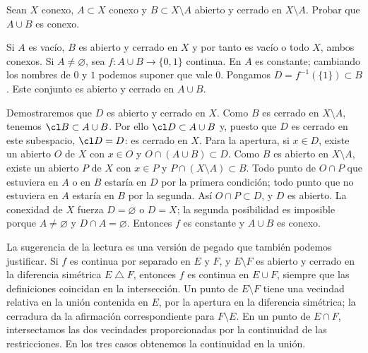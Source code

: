 \begin{ejercicio}\label{ch17:ex6}
Sean $X$ conexo, $A\subset X$ conexo y $B\subset X\setminus A$ abierto y cerrado en $X\setminus A$. Probar que $A\cup B$ es conexo.
\end{ejercicio}
\begin{solucion}
Si $A$ es vacío, $B$ es abierto y cerrado en $X$ y por tanto es vacío o todo $X$, ambos conexos. Si $A\ne\varnothing$, sea $f:A\cup B\to\{0,1\}$ continua. En $A$ es constante; cambiando los nombres de $0$ y $1$ podemos suponer que vale $0$. Pongamos $D=f^{-1}(\{1\})\subset B$. Este conjunto es abierto y cerrado en $A\cup B$.

Demostraremos que $D$ es abierto y cerrado en $X$. Como $B$ es cerrado en $X\setminus A$, tenemos $\cl B\subset A\cup B$. Por ello $\cl D\subset A\cup B$ y, puesto que $D$ es cerrado en este subespacio, $\cl D=D$: es cerrado en $X$. Para la apertura, si $x\in D$, existe un abierto $O$ de $X$ con $x\in O$ y $O\cap(A\cup B)\subset D$. Como $B$ es abierto en $X\setminus A$, existe un abierto $P$ de $X$ con $x\in P$ y $P\cap(X\setminus A)\subset B$. Todo punto de $O\cap P$ que estuviera en $A$ o en $B$ estaría en $D$ por la primera condición; todo punto que no estuviera en $A$ estaría en $B$ por la segunda. Así $O\cap P\subset D$, y $D$ es abierto. La conexidad de $X$ fuerza $D=\varnothing$ o $D=X$; la segunda posibilidad es imposible porque $A\ne\varnothing$ y $D\cap A=\varnothing$. Entonces $f$ es constante y $A\cup B$ es conexo.

La sugerencia de la lectura es una versión de pegado que también podemos justificar. Si $f$ es continua por separado en $E$ y $F$, y $E\setminus F$ es abierto y cerrado en la diferencia simétrica $E\mathbin{\triangle}F$, entonces $f$ es continua en $E\cup F$, siempre que las definiciones coincidan en la intersección. Un punto de $E\setminus F$ tiene una vecindad relativa en la unión contenida en $E$, por la apertura en la diferencia simétrica; la cerradura da la afirmación correspondiente para $F\setminus E$. En un punto de $E\cap F$, intersectamos las dos vecindades proporcionadas por la continuidad de las restricciones. En los tres casos obtenemos la continuidad en la unión.
\end{solucion}

